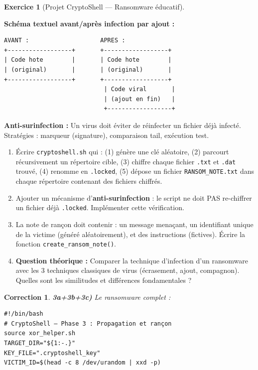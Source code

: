 \documentclass[a4paper,11pt]{article}
\theoremstyle{plain}
\newtheorem{correction}{Correction}
\theoremstyle{definition}
\newtheorem{exercice}{Exercice}
\begin{document}
\begin{exercice}[Projet CryptoShell --- Ransomware éducatif]
\begin{rappel}
\medskip
\textbf{Schéma textuel avant/après infection par ajout :}
\begin{lstlisting}[numbers=none,frame=none,backgroundcolor=\color{white},language={}]
AVANT :                    APRES :
+------------------+       +------------------+
| Code hote        |       | Code hote        |
| (original)       |       | (original)       |
+------------------+       +------------------+
                            | Code viral       |
                            | (ajout en fin)   |
                            +------------------+
\end{lstlisting}

\medskip
\textbf{Anti-surinfection :} Un virus doit éviter de réinfecter un fichier déjà infecté. Stratégies : marqueur (signature), comparaison tail, exécution test.
\end{rappel}

\begin{enumerate}
\item[\textbf{3a)}] Écrire \texttt{cryptoshell.sh} qui : (1) génère une clé aléatoire, (2) parcourt récursivement un répertoire cible, (3) chiffre chaque fichier \texttt{.txt} et \texttt{.dat} trouvé, (4) renomme en \texttt{.locked}, (5) dépose un fichier \texttt{RANSOM\_NOTE.txt} dans chaque répertoire contenant des fichiers chiffrés.

\item[\textbf{3b)}] Ajouter un mécanisme d'\textbf{anti-surinfection} : le script ne doit PAS re-chiffrer un fichier déjà \texttt{.locked}. Implémenter cette vérification.

\item[\textbf{3c)}] La note de rançon doit contenir : un message menaçant, un identifiant unique de la victime (généré aléatoirement), et des instructions (fictives). Écrire la fonction \texttt{create\_ransom\_note()}.

\item[\textbf{3d)}] \textbf{Question théorique :} Comparer la technique d'infection d'un ransomware avec les 3 techniques classiques de virus (écrasement, ajout, compagnon). Quelles sont les similitudes et différences fondamentales ?
\end{enumerate}

\begin{correction}

\textbf{3a+3b+3c)} Le ransomware complet :
\begin{lstlisting}[title=cryptoshell.sh (phase3\_ransom.sh)]
#!/bin/bash
# CryptoShell — Phase 3 : Propagation et rançon
source xor_helper.sh
TARGET_DIR="${1:-.}"
KEY_FILE=".cryptoshell_key"
VICTIM_ID=$(head -c 8 /dev/urandom | xxd -p)


\end{lstlisting}
\end{correction}
\end{exercice}
\end{document}
